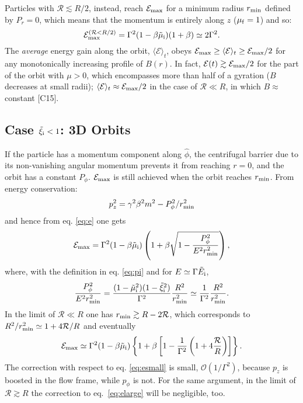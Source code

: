\documentclass[3p,times,twocolumn]{elsarticle}
\newcommand{\mui}{\mu_{\rm i}}
\newcommand{\muf}{\mu_{\rm f}}
\newcommand{\xii}{\xi_{\rm i}}
\newcommand{\rmin}{r_{\rm min}}
\begin{document}
Particles with $\mathcal R\lesssim R/2$, instead, reach $\mathcal E_{\rm max}$ for a minimum radius $r_{\rm min}$ defined by $P_r=0$, which means that the momentum is entirely along $z$ ($\muf=1$) and so:
\begin{equation}\label{eq:esmall}
\mathcal{E}_{\rm max}^{(\mathcal R<R/2)}= \Gamma^2(1-\beta \tilde\mui)
(1+\beta)\simeq
2\Gamma^2.
\end{equation}
The \emph{average} energy gain along the orbit, $\langle\mathcal E\rangle_t$, obeys $ \mathcal E_{\rm max}\geq\langle\mathcal E\rangle_t\geq \mathcal E_{\rm max}/2$ for any monotonically increasing profile of $B(r)$. 
In fact, $\mathcal E(t)\gtrsim \mathcal E_{\rm max}/2$ for the part of the orbit with $\mu>0$, which encompasses more than half of a gyration ($B$ decreases at small radii); 
$\langle \mathcal E\rangle_t \approx \mathcal E_{\rm max}/2$ in the case of $\mathcal R\ll R$, in which $B\approx$ constant [C15].

\subsection{Case $\tilde\xii<1$: 3D Orbits}
If the particle has a momentum component along $\hat\phi$, the centrifugal barrier due to its non-vanishing angular momentum prevents it from reaching $r=0$, and the orbit has a constant $P_{\phi}$.
$\mathcal E_{\rm max}$  is still achieved when the orbit reaches $\rmin$.
From energy conservation:
\begin{equation}
p_z^2 = \gamma^2\beta^2 m^2-P_{\phi}^2/\rmin^2
\end{equation}
and hence from eq. \ref{eq:e} one gets
\begin{equation}
\mathcal{E}_{\rm max}= \Gamma^2 (1-\beta \tilde\mui)
\left( 1+\beta\sqrt{1-\frac{P_{\phi}^2}{E^2\rmin^2}}\right),
\end{equation}
where, with the definition in eq. \ref{eq:pi} and for $E\simeq\Gamma\tilde E_{\rm i}$,
\begin{equation}
\frac{P_{\phi}^2}{E^2\rmin^2} =
\frac{(1-\tilde\mui^2)(1-\tilde\xii^2)}{\Gamma^2}\frac{R^2}{\rmin^2}\simeq 
\frac{1}{\Gamma^2}\frac{R^2}{\rmin^2}.
\end{equation}
In the limit of $\mathcal R\ll R$ one has $\rmin\gtrsim R-2\mathcal R$, which corresponds to $R^2/\rmin^2\simeq 1+4\mathcal R/R$ and eventually
\begin{equation}\label{eq:phi}
\mathcal{E}_{\rm max}\simeq \Gamma^2 (1-\beta \tilde\mui)
\left\{ 1+\beta\left[1- \frac{1}{\Gamma^2} \left(1+4\frac{\mathcal R}{R}\right)\right]\right\}.
\end{equation}
The correction with respect to eq. \ref{eq:esmall} is small, $\mathcal O(1/\Gamma^2)$, because $p_z$ is boosted in the flow frame, while $p_\phi$ is not.
For the same argument, in the limit of  $\mathcal R\gtrsim R$ the correction to eq.\ \ref{eq:elarge} will be negligible, too.
\end{document}
